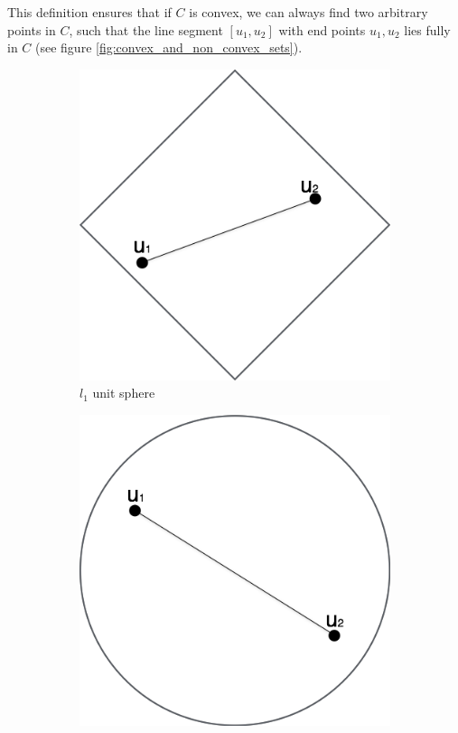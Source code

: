 \documentclass{scrreprt}
\begin{document}
        This definition ensures that if $C$ is convex, we can always find two arbitrary points in $C$, such that the line segment $[u_{1}, u_{2}]$ with end points $u_{1}, u_{2}$ lies fully in $C$ (see figure \ref{fig:convex_and_non_convex_sets}).
        \begin{figure}[!ht]
            \centering
            \begin{subfigure}[b]{0.3\textwidth}
                \includegraphics[width=\textwidth]{img/unit_l1_norm.png}
                \caption{$l_{1}$ unit sphere}
            \end{subfigure}
            \begin{subfigure}[b]{0.3\textwidth}
                \includegraphics[width=\textwidth]{img/unit_l2_norm.png}

\end{subfigure}
\end{figure}
\end{document}
